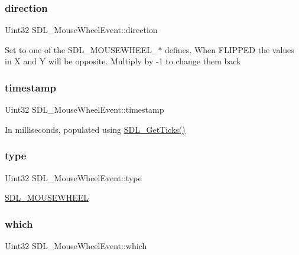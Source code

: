 \subsubsection{\texorpdfstring{direction}{direction}}
{\footnotesize\ttfamily Uint32 S\+D\+L\+\_\+\+Mouse\+Wheel\+Event\+::direction}

Set to one of the S\+D\+L\+\_\+\+M\+O\+U\+S\+E\+W\+H\+E\+E\+L\+\_\+$\ast$ defines. When F\+L\+I\+P\+P\+ED the values in X and Y will be opposite. Multiply by -\/1 to change them back \mbox{\label{struct_s_d_l___mouse_wheel_event_a83ad52c80ff49a8e75dc6c33bba65fa0}} 
\subsubsection{\texorpdfstring{timestamp}{timestamp}}
{\footnotesize\ttfamily Uint32 S\+D\+L\+\_\+\+Mouse\+Wheel\+Event\+::timestamp}

In milliseconds, populated using \mbox{\hyperlink{_s_d_l__timer_8h_a0b9bc71d6287e0ffafdc3419760fe2b3}{S\+D\+L\+\_\+\+Get\+Ticks()}} \mbox{\label{struct_s_d_l___mouse_wheel_event_aa6b741e99df708c6f9550ee0f520fb70}} 
\subsubsection{\texorpdfstring{type}{type}}
{\footnotesize\ttfamily Uint32 S\+D\+L\+\_\+\+Mouse\+Wheel\+Event\+::type}

\mbox{\hyperlink{_s_d_l__events_8h_a3b589e89be6b35c02e0dd34a55f3fccaa63135c2e0aea2286f05066f3c0bc5c4e}{S\+D\+L\+\_\+\+M\+O\+U\+S\+E\+W\+H\+E\+EL}} \mbox{\label{struct_s_d_l___mouse_wheel_event_a014dc767d52e8b75ba26a5f12e1704e8}} 
\subsubsection{\texorpdfstring{which}{which}}
{\footnotesize\ttfamily Uint32 S\+D\+L\+\_\+\+Mouse\+Wheel\+Event\+::which}

